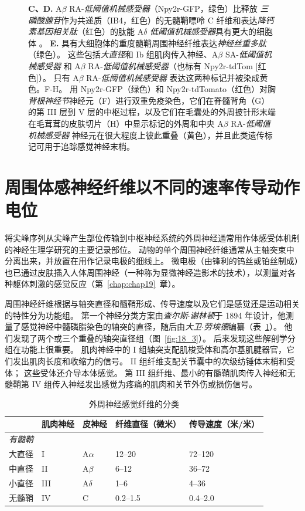 \begin{figure}[htbp]
{		\textbf{C、D.} A$\beta$ RA-\textit{低阈值机械感受器}（Npy2r-GFP，绿色）比释放 \textit{三磷酸腺苷}作为共递质（IB4，红色）的无髓鞘嘌呤 C 纤维和表达\textit{降钙素基因相关肽}（红色）的肽能 A$\delta$ \textit{低阈值机械感受器}具有更大的细胞体 。
		\textbf{E.} 具有大细胞体的重度髓鞘周围神经纤维表达\textit{神经丝重多肽}（绿色）。
		这些包括\textit{大直径}和 Ib 组肌肉传入神经、A$\beta$ SA-\textit{低阈值机械感受器} 和 A$\beta$ RA-\textit{低阈值机械感受器}（也标有 Npy2r-tdTom [红色]）。
		只有 A$\beta$ RA-\textit{低阈值机械感受器} 表达这两种标记并被染成黄色。F-H。
		用 Npy2r-GFP（绿色）和 Npy2r-tdTomato（红色）对胸\textit{背根神经节}神经元（F）进行双重免疫染色，它们在脊髓背角（G）的第 III 层到 V 层的中枢过程，以及它们在毛囊处的外周披针形末端 在毛茸茸的皮肤切片（H）中显示标记的外周和中央 A$\beta$ RA-\textit{低阈值机械感受器} 神经元在很大程度上彼此重叠（黄色），并且此类遗传标记可用于追踪感觉神经末梢。}
	\label{fig:18_2}
\end{figure}



\section{周围体感神经纤维以不同的速率传导动作电位}

将尖峰序列从尖峰产生部位传输到中枢神经系统的外周神经通常用作体感受体机制的神经生理学研究的主要记录部位。
动物的单个周围神经纤维通常从主轴突束中分离出来，并放置在用作记录电极的细线上。
微电极（由锋利的钨丝或铂丝制成）也已通过皮肤插入人体周围神经（一种称为显微神经造影术的技术），以测量对各种躯体刺激的感觉反应（第~\ref{chap:chap19}~章）。


周围神经纤维根据与轴突直径和髓鞘形成、传导速度以及它们是感觉还是运动相关的特性分为功能组。
第一个神经分类方案由\textit{查尔斯$\cdot$谢林顿}于 1894 年设计，他测量了感觉神经中髓磷脂染色的轴突的直径，随后由\textit{大卫$\cdot$劳埃德}编纂（表~\ref{tab:18_1}）。
他们发现了两个或三个重叠的轴突直径组（图~\ref{fig:18_3}）。
后来发现这些解剖学分组在功能上很重要。
肌肉神经中的 I 组轴突支配肌梭受体和高尔基肌腱器官，它们发出肌肉长度和收缩力的信号。
II 组纤维支配关节囊中的次级纺锤体末梢和受体；
这些受体还介导本体感觉。
第 III 组纤维、最小的有髓鞘肌肉传入神经和无髓鞘第 IV 组传入神经发出感觉为疼痛的肌肉和关节外伤或损伤信号。


\begin{table}[htbp]
	\caption{外周神经感觉纤维的分类} \label{tab:18_1} \centering
	\begin{tabular}{lllll}
		\toprule
		 & 肌肉神经 & 皮神经 & 纤维直径（微米） & 传导速度（米/米）\\
		\midrule
		\textit{有髓鞘} &  &  & &  \\
		大直径 & I  & A$\alpha$ & 12–20 & 72–120 \\
		中直径 & II  & A$\beta$ & 6–12 & 36–72 \\
		小直径 & III  & A$\delta$ & 1–6 & 4–36 \\
		无髓鞘 & IV  & C & 0.2–1.5 & 0.4–2.0 \\
		\bottomrule
	\end{tabular}
\end{table}



